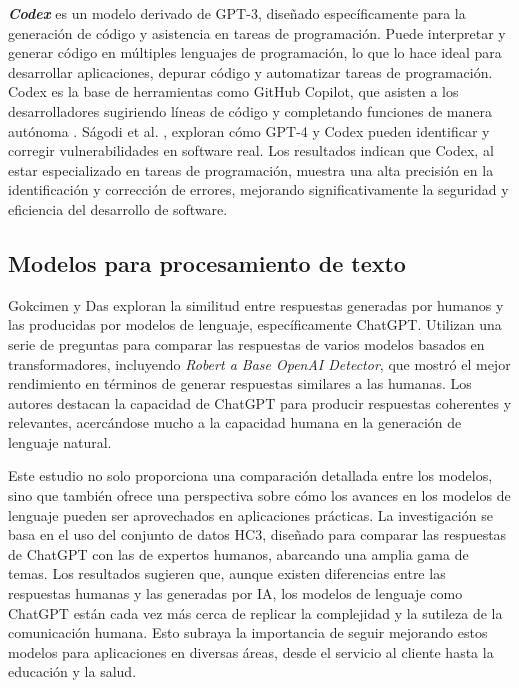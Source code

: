 \textbf{\textit{Codex}} es un modelo derivado de GPT-3, diseñado específicamente para la generación de código y asistencia en tareas de programación. Puede interpretar y generar código en múltiples lenguajes de programación, lo que lo hace ideal para desarrollar aplicaciones, depurar código y automatizar tareas de programación. Codex es la base de herramientas como GitHub Copilot, que asisten a los desarrolladores sugiriendo líneas de código y completando funciones de manera autónoma \cite{Elon2024}. Ságodi et al. \cite{Sagodi2024}, exploran cómo GPT-4 y Codex pueden identificar y corregir vulnerabilidades en software real. Los resultados indican que Codex, al estar especializado en tareas de programación, muestra una alta precisión en la identificación y corrección de errores, mejorando significativamente la seguridad y eficiencia del desarrollo de software.


\subsection{Modelos para procesamiento de texto}

Gokcimen y Das \cite{Gokcimen2023} exploran la similitud entre respuestas generadas por humanos y las producidas por modelos de lenguaje, específicamente ChatGPT. Utilizan una serie de preguntas para comparar las respuestas de varios modelos basados en transformadores, incluyendo \textit{Robert a Base OpenAI Detector}, que mostró el mejor rendimiento en términos de generar respuestas similares a las humanas. Los autores destacan la capacidad de ChatGPT para producir respuestas coherentes y relevantes, acercándose mucho a la capacidad humana en la generación de lenguaje natural.

Este estudio no solo proporciona una comparación detallada entre los modelos, sino que también ofrece una perspectiva sobre cómo los avances en los modelos de lenguaje pueden ser aprovechados en aplicaciones prácticas. La investigación se basa en el uso del conjunto de datos HC3, diseñado para comparar las respuestas de ChatGPT con las de expertos humanos, abarcando una amplia gama de temas. Los resultados sugieren que, aunque existen diferencias entre las respuestas humanas y las generadas por IA, los modelos de lenguaje como ChatGPT están cada vez más cerca de replicar la complejidad y la sutileza de la comunicación humana. Esto subraya la importancia de seguir mejorando estos modelos para aplicaciones en diversas áreas, desde el servicio al cliente hasta la educación y la salud.

